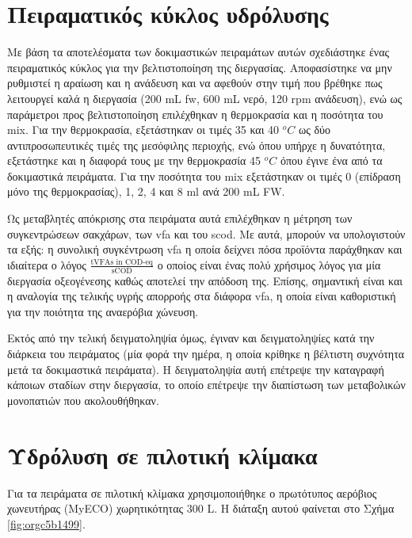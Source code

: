 \documentclass[11pt]{report}
\begin{document}
\section{Πειραματικός κύκλος υδρόλυσης}
\label{sec:orga86d6a2}
\label{sec:lab-hydro}
Με βάση τα αποτελέσματα των δοκιμαστικών πειραμάτων αυτών σχεδιάστηκε ένας πειραματικός κύκλος για την βελτιστοποίηση της διεργασίας. Αποφασίστηκε να μην ρυθμιστεί η αραίωση και η ανάδευση και να αφεθούν στην τιμή που βρέθηκε πως λειτουργεί καλά η διεργασία (200 mL \acrshort{fw}, 600 mL νερό, 120 rpm ανάδευση), ενώ ως παράμετροι προς βελτιστοποίηση επιλέχθηκαν η θερμοκρασία και η ποσότητα του \acrshort{mix}. Για την θερμοκρασία, εξετάστηκαν οι τιμές 35 και 40 \(^oC\) ως δύο αντιπροσωπευτικές τιμές της μεσόφιλης περιοχής, ενώ όπου υπήρχε η δυνατότητα, εξετάστηκε και η διαφορά τους με την θερμοκρασία 45 \(^oC\) όπου έγινε ένα από τα δοκιμαστικά πειράματα. Για την ποσότητα του \acrshort{mix} εξετάστηκαν οι τιμές 0 (επίδραση μόνο της θερμοκρασίας), 1, 2, 4 και 8 ml ανά 200 mL FW. 

Ως μεταβλητές απόκρισης στα πειράματα αυτά επιλέχθηκαν η μέτρηση των συγκεντρώσεων σακχάρων, των \acrshort{vfa} και του \acrshort{scod}.  Με αυτά, μπορούν να υπολογιστούν τα εξής: η συνολική συγκέντρωση \acrshort{vfa} η οποία δείχνει πόσα προϊόντα παράχθηκαν και ιδιαίτερα ο λόγος \(\frac{\text{tVFAs in COD-eq}}{\text{sCOD}}\) ο οποίος είναι ένας πολύ χρήσιμος λόγος για μία διεργασία οξεογένεσης καθώς αποτελεί την απόδοση της. Επίσης, σημαντική είναι και η αναλογία της τελικής υγρής απορροής στα διάφορα \acrshort{vfa}, η οποία είναι καθοριστική για την ποιότητα της αναερόβια χώνευση.

Εκτός από την τελική δειγματοληψία όμως, έγιναν και δειγματοληψίες κατά την διάρκεια του πειράματος (μία φορά την ημέρα, η οποία κρίθηκε η βέλτιστη συχνότητα μετά τα δοκιμαστικά πειράματα). Η δειγματοληψία αυτή επέτρεψε την καταγραφή κάποιων σταδίων στην διεργασία, το οποίο επέτρεψε την διαπίστωση των μεταβολικών μονοπατιών που ακολουθήθηκαν.

\section{Υδρόλυση σε πιλοτική κλίμακα}
\label{sec:org5306d9a}
\label{sec:pilot-exp}

Για τα πειράματα σε πιλοτική κλίμακα χρησιμοποιήθηκε ο πρωτότυπος αερόβιος χωνευτήρας (MyECO) χωρητικότητας 300 L. Η διάταξη αυτού φαίνεται στο Σχήμα \ref{fig:orgc5b1499}.
\end{document}

